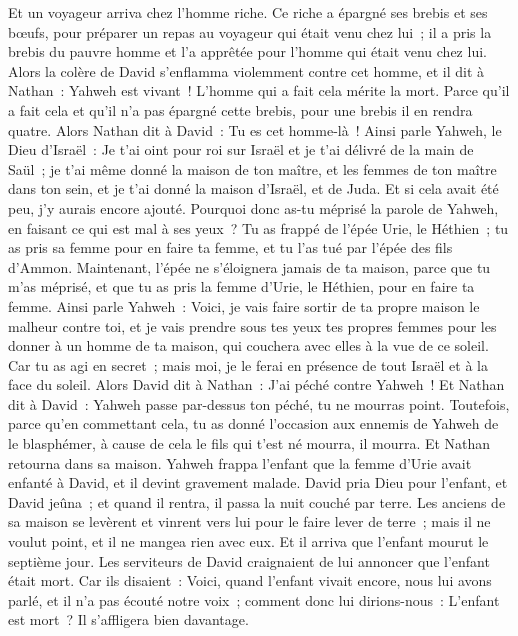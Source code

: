 \begin{multicols}{2}
Et un voyageur arriva chez l'homme riche. Ce riche a épargné ses brebis et ses bœufs, pour préparer un repas au voyageur qui était venu chez lui~; il a pris la brebis du pauvre homme et l'a apprêtée pour l'homme qui était venu chez lui.
Alors la colère de David s'enflamma violemment contre cet homme, et il dit à Nathan~: Yahweh est vivant~! L'homme qui a fait cela mérite la mort.
Parce qu'il a fait cela et qu'il n'a pas épargné cette brebis, pour une brebis il en rendra quatre.
Alors Nathan dit à David~: Tu es cet homme-là~! Ainsi parle Yahweh, le Dieu d'Israël~: Je t'ai oint pour roi sur Israël et je t'ai délivré de la main de Saül~;
je t'ai même donné la maison de ton maître, et les femmes de ton maître dans ton sein, et je t'ai donné la maison d'Israël, et de Juda. Et si cela avait été peu, j'y aurais encore ajouté.
Pourquoi donc as-tu méprisé la parole de Yahweh, en faisant ce qui est mal à ses yeux~? Tu as frappé de l'épée Urie, le Héthien~; tu as pris sa femme pour en faire ta femme, et tu l'as tué par l'épée des fils d'Ammon.
Maintenant, l'épée ne s'éloignera jamais de ta maison, parce que tu m'as méprisé, et que tu as pris la femme d'Urie, le Héthien, pour en faire ta femme.
Ainsi parle Yahweh~: Voici, je vais faire sortir de ta propre maison le malheur contre toi, et je vais prendre sous tes yeux tes propres femmes pour les donner à un homme de ta maison, qui couchera avec elles à la vue de ce soleil.
Car tu as agi en secret~; mais moi, je le ferai en présence de tout Israël et à la face du soleil.
Alors David dit à Nathan~: J'ai péché contre Yahweh~! Et Nathan dit à David~: Yahweh passe par-dessus ton péché, tu ne mourras point.
Toutefois, parce qu'en commettant cela, tu as donné l'occasion aux ennemis de Yahweh de le blasphémer, à cause de cela le fils qui t'est né mourra, il mourra.
Et Nathan retourna dans sa maison. Yahweh frappa l'enfant que la femme d'Urie avait enfanté à David, et il devint gravement malade.
David pria Dieu pour l'enfant, et David jeûna~; et quand il rentra, il passa la nuit couché par terre.
Les anciens de sa maison se levèrent et vinrent vers lui pour le faire lever de terre~; mais il ne voulut point, et il ne mangea rien avec eux.
Et il arriva que l'enfant mourut le septième jour. Les serviteurs de David craignaient de lui annoncer que l'enfant était mort. Car ils disaient~: Voici, quand l'enfant vivait encore, nous lui avons parlé, et il n'a pas écouté notre voix~; comment donc lui dirions-nous~: L'enfant est mort~? Il s'affligera bien davantage.

\end{multicols}
